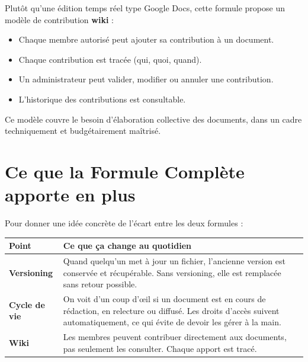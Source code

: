 \documentclass[a4paper,12pt,french]{article}
\begin{document}
Plutôt qu'une édition temps réel type Google Docs, cette formule propose un modèle de contribution \textbf{wiki} :

\begin{itemize}[leftmargin=1.5em]
  \item Chaque membre autorisé peut ajouter sa contribution à un document.
  \item Chaque contribution est tracée (qui, quoi, quand).
  \item Un administrateur peut valider, modifier ou annuler une contribution.
  \item L'historique des contributions est consultable.
\end{itemize}

Ce modèle couvre le besoin d'élaboration collective des documents, dans un cadre techniquement et budgétairement maîtrisé.

\section{Ce que la Formule Complète apporte en plus}

Pour donner une idée concrète de l'écart entre les deux formules :

\vspace{0.5em}

\begin{tabularx}{\textwidth}{l X}
\toprule
\textbf{Point} & \textbf{Ce que ça change au quotidien} \\
\midrule

\textbf{Versioning} &
Quand quelqu'un met à jour un fichier, l'ancienne version est conservée et récupérable. Sans versioning, elle est remplacée sans retour possible. \\
\addlinespace

\textbf{Cycle de vie} &
On voit d'un coup d'œil si un document est en cours de rédaction, en relecture ou diffusé. Les droits d'accès suivent automatiquement, ce qui évite de devoir les gérer à la main. \\
\addlinespace

\textbf{Wiki} &
Les membres peuvent contribuer directement aux documents, pas seulement les consulter. Chaque apport est tracé. \\

\bottomrule
\end{tabularx}

\vspace{0.8em}
\end{document}
